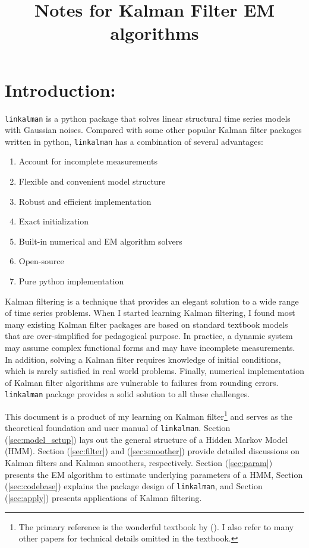 \documentclass[10pt]{article}
\newenvironment{boenumerate}
    {\begin{enumerate}\renewcommand\labelenumi{\textbf\theenumi}}
    {\end{enumerate}}
\numberwithin{equation}{section}
\begin{document}
\title{Notes for Kalman Filter EM algorithms}

\section{Introduction:}
\texttt{linkalman} is a python package that solves linear structural time series models with Gaussian noises. Compared with some other popular Kalman filter packages written in python, \texttt{linkalman} has a combination of several advantages:
\begin{boenumerate}
    \item Account for incomplete measurements 
    \item Flexible and convenient model structure
    \item Robust and efficient implementation
    \item Exact initialization
    \item Built-in numerical and EM algorithm solvers
    \item Open-source
    \item Pure python implementation 
\end{boenumerate}
Kalman filtering is a technique that provides an elegant solution to a wide range of time series problems. When I started learning Kalman filtering, I found most many existing Kalman filter packages are based on standard textbook models that are over-simplified for pedagogical purpose. In practice, a dynamic system may assume complex functional forms and may have incomplete measurements. In addition, solving a Kalman filter requires knowledge of initial conditions, which is rarely satisfied in real world problems. Finally, numerical implementation of Kalman filter algorithms are vulnerable to failures from rounding errors. \texttt{linkalman} package provides a solid solution to all these challenges. 

This document is a product of my learning on Kalman filter\footnote{The primary reference is the wonderful textbook by (\cite{durbin_koopman_2001}). I also refer to many other papers for technical details omitted in the textbook.} and serves as the theoretical foundation and user manual of \texttt{linkalman}. Section (\ref{sec:model_setup}) lays out the general structure of a Hidden Markov Model (HMM). Section (\ref{sec:filter}) and (\ref{sec:smoother}) provide detailed discussions on Kalman filters and Kalman smoothers, respectively. Section (\ref{sec:param}) presents the EM algorithm to estimate underlying parameters of a HMM, Section (\ref{sec:codebase}) explains the package design of \texttt{linkalman}, and Section (\ref{sec:apply}) presents applications of Kalman filtering. 
\end{document}
